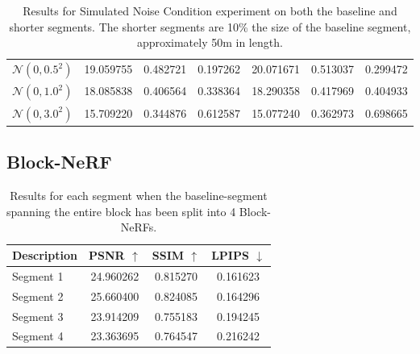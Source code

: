 \begin{table}[H]
\begin{tabular}{l | C{2.2} C{1.3} C{1.3} | C{2.2} C{1.3} C{1.3}}
$\mathcal{N}(0, 0.5^2)$ & 19.059755 & 0.482721 & 0.197262 & 20.071671 & 0.513037 & 0.299472 \\ 
$\mathcal{N}(0, 1.0^2)$ & 18.085838 & 0.406564 & 0.338364 & 18.290358 & 0.417969 & 0.404933 \\ 
$\mathcal{N}(0, 3.0^2)$ & 15.709220 & 0.344876 & 0.612587 & 15.077240 & 0.362973 & 0.698665 \\ 
\hline
\end{tabular}
\caption[Full results for experiment 2: Simulated Noise Conditions]{Results for Simulated Noise Condition experiment on both the baseline and shorter segments. The shorter segments are 10\% the size of the baseline segment, approximately 50m in length.}
\label{tab:exp-gaussian-noise-full}
\end{table}

\subsection{Block-NeRF}

\begin{table}[H]
\centering
\setlength{\tabcolsep}{6pt}
\renewcommand{\arraystretch}{1.5}
\begin{tabular}{l | C{2.2} C{1.3} C{1.3}}
\hline
\textbf{Description} & \textbf{PSNR $\uparrow$} & \textbf{SSIM $\uparrow$} & \textbf{LPIPS $\downarrow$} \\
\hline
Segment 1 & 24.960262 & 0.815270 & 0.161623 \\
Segment 2 & 25.660400 & 0.824085 & 0.164296 \\
Segment 3 & 23.914209 & 0.755183 & 0.194245 \\
Segment 4 & 23.363695 & 0.764547 & 0.216242 \\
\hline
\end{tabular}
\caption[Full results for experiment 4: Block-NeRF on 4-segment dataset]{Results for each segment when the baseline-segment spanning the entire block has been split into 4 Block-NeRFs.}
\label{tab:block-nerf-four-segments-full}
\end{table}


